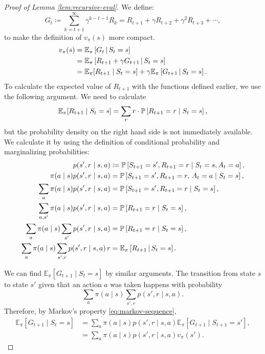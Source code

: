 \begin{proof}[Proof of Lemma \ref{lem:recursive-eval}]
	We define:
	\[
		G_t \coloneqq \sum_{k=t+1}^{\infty} \gamma^{k-t-1} R_k = R_{t+1} + \gamma R_{t+2} + \gamma^{2} R_{t+3} + \cdots, 
	\]
	to make the definition of $v_\pi (s)$ more compact.
	\begin{align}
		v_\pi (s) &= \mathbb{E}_\pi \left[ G_t \,\middle\vert\, S_t = s \right] \nonumber \\
		&= \mathbb{E}_\pi \left[ R_{t+1} + \gamma G_{t+1} \,\middle\vert\, S_t = s \right] \nonumber \\
		\label{eq:paso-2}
		&= \mathbb{E}_\pi [R_{t+1} \mid S_t = s] + \gamma \mathbb{E}_\pi \left[ G_{t+1} \,\middle\vert\, S_{t} = s \right].
	\end{align}
	To calculate the expected value of $R_{t+1}$ with the functions defined
	earlier, we use the following argument. We need to calculate
	\[
		\mathbb{E}_\pi [R_{t+1} \mid S_t = s] = \sum_{r} r \cdot \mathbb{P}\left[R_{t+1} = r \mid S_t = s\right],
	\]
	but the probability density on the right hand side is not immediately
	available. We calculate it by using the definition of conditional
	probability and marginalizing probabilities:
	\begin{align}
		p(s', r \mid s, a) &\coloneqq \mathbb{P}\left[S_{t+1} = s', R_{t+1} = r \mid S_t = s, A_t = a\right], \nonumber \\
		\pi(a \mid s) p(s', r \mid s, a) &= \mathbb{P}\left[S_{t+1} = s', R_{t+1} = r, \, A_t = a \mid S_{t} = s\right], \nonumber \\
		\sum_{a} \pi(a \mid s) p(s', r \mid s, a) &= \mathbb{P}\left[S_{t+1} = s', R_{t+1} = r \mid S_{t} = s\right], \nonumber \\
		\sum_{a, s'} \pi(a \mid s) p(s', r \mid s, a) &= \mathbb{P}\left[R_{t+1} = r \mid S_{t} = s\right] , \nonumber\\
		\sum_{a} \pi(a \mid s) \sum_{s'} p(s', r \mid s, a) &=  \mathbb{P}\left[R_{t+1} = r \mid S_{t} = s\right], \nonumber \\
		\sum_{a} \pi(a \mid s) \sum_{s', r} p(s', r \mid s, a) \, r &= \mathbb{E}_\pi \left[ R_{t+1} \,\middle\vert\, S_t = s \right]. \label{eq:cacho-uno}
	\end{align}

	We can find $\mathbb{E}_\pi [G_{t+1} \mid S_t = s]$ by similar arguments.
	The transition from state $s$ to state $s'$ given that an action $a$ was
	taken happens with probability
	\[
		\sum_a \pi(a \mid s) \sum_{s', r} p(s', r \mid s, a).
	\]
	Therefore, by Markov's property \eqref{eq:markov-sequence},
	\begin{align}
		\label{eq:cacho-dos}
		\mathbb{E}_\pi [G_{t+1} \mid S_t = s] &= \sum_a \pi(a \mid s) p(s', r \mid s, a) \mathbb{E}_\pi \left[ G_{t+1} \mid S_{t+1} = s' \right], \nonumber \\
		&= \sum_a \pi(a \mid s) p(s', r \mid s, a) v_\pi (s').
	\end{align}


\end{proof}
